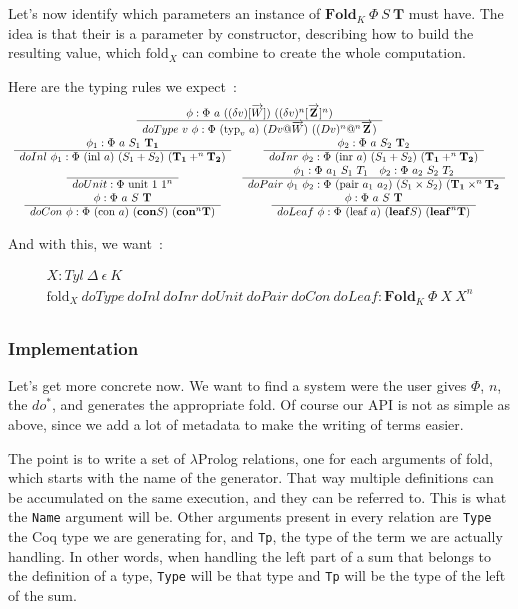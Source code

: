 \documentclass{article}
\newcommand{\vc}[1]{\overrightarrow{#1}}
\newcommand{\con}{\mathbf{con}}
\newcommand{\lf}{\mathbf{leaf}}
\newcommand{\fld}{\mathbf{Fold}}
\newcommand{\irule}[2]{\begin{array}{c} {#1} \\\hline {#2}\\ \end{array}}
\begin{document}
Let's now identify which parameters an instance of $\fld_K\ \Phi\ S\ \mathbf{T}$
must have. The idea is that their is a parameter by constructor, describing
how to build the resulting value, which $\text{fold}_X$ can combine to create
the whole computation.

Here are the typing rules we expect~:
\[\begin{array}{cc}
    \multicolumn{2}{c}{\irule{\phi : \Phi\ a\ ((\delta v)[\vc{W}])\ ((\delta v)^n[\vc{\mathbf{Z}}]^n)}
        {doType\ v\ \phi : \Phi\ (\text{typ}_v\ a)\ (D v @ \vc{W})\ ((D v)^n@^n\vc{\mathbf{Z}})}} \\
    \irule{\phi_1 : \Phi\ a\ S_1\ \mathbf{T_1}}
            {doInl\ \phi_1 : \Phi\ (\text{inl}\ a)\ (S_1 + S_2)\ (\mathbf{T_1} +^n \mathbf{T_2})}
        & \irule{\phi_2 : \Phi\ a\ S_2\ \mathbf{T}_2}
            {doInr\ \phi_2 : \Phi\ (\text{inr}\ a)\ (S_1 + S_2)\ (\mathbf{T_1} +^n \mathbf{T_2})} \\
    \irule{}{doUnit : \Phi\ \text{unit}\ 1\ 1^n}
        & \irule{\phi_1 : \Phi\ a_1\ S_1\ T_1\quad\phi_2 : \Phi\ a_2\ S_2\ T_2}
            {doPair\ \phi_1\ \phi_2 : \Phi\ (\text{pair}\ a_1\ a_2)\
                (S_1\times S_2)\ (\mathbf{T_1}\times^n\mathbf{T_2}} \\
    \irule{\phi : \Phi\ a\ S\ \mathbf{T}}{doCon\ \phi : \Phi\ (\text{con}\ a)\ (\con S)\ (\con^n\mathbf{T})}
        & \irule{\phi : \Phi\ a\ S\ \mathbf{T}}
            {doLeaf\ \phi : \Phi\ (\text{leaf}\ a)\ (\lf S)\ (\lf^n\mathbf{T})} \\
\end{array}\]

And with this, we want~:

\[ \irule{X : Tyl\ \Delta\ \epsilon\ K}
    {\text{fold}_X\ doType\ doInl\ doInr\ doUnit\ doPair\ doCon\ doLeaf : \fld_K\ \Phi\ X\ X^n} \]

\subsubsection{Implementation}

Let's get more concrete now. We want to find a system were the user gives $\Phi$, $n$,
the $do^*$, and generates the appropriate fold. Of course our API is not as
simple as above, since we add a lot of metadata to make the writing of terms
easier.

The point is to write a set of $\lambda$Prolog relations, one for each arguments
of fold, which starts with the name of the generator. That way multiple definitions
can be accumulated on the same execution, and they can be referred to. This is
what the \texttt{Name} argument will be. Other arguments present in every relation
are \texttt{Type} the Coq type we are
generating for, and \texttt{Tp}, the type of the term we are actually
handling. In other words, when handling the left part of a sum that belongs to
the definition of a type, \texttt{Type} will be that type and \texttt{Tp} will
be the type of the left of the sum.
\end{document}
